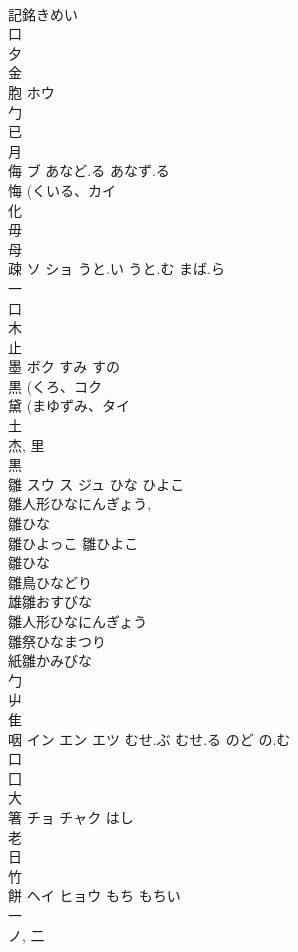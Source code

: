 \documentclass[8pt]{extreport}
\begin{document}
\begin{CJK}{UTF8}{min}
\\	記銘きめい
\\	口 
\\	夕 
\\	金 
\\	胞	ホウ		
\\	勹 
\\	已 
\\	月 
\\	侮	ブ	あなど.る あなず.る	
\\	悔 (くいる、カイ 
\\	化 
\\	毋 
\\	母 
\\	疎	ソ ショ	うと.い うと.む まば.ら	
\\	一 
\\	口 
\\	木 
\\	止 
\\	墨	ボク	すみ すの	
\\	黒 (くろ、コク 
\\	黛 (まゆずみ、タイ 
\\	土 
\\	杰, 里 
\\	黒 
\\	雛	スウ ス ジュ	ひな ひよこ	
\\	雛人形ひなにんぎょう, 
\\	雛ひな 
\\	雛ひよっこ 雛ひよこ 
\\	雛ひな 
\\	雛鳥ひなどり 
\\	雄雛おすびな 
\\	雛人形ひなにんぎょう 
\\	雛祭ひなまつり 
\\	紙雛かみびな 
\\	勹 
\\	屮 
\\	隹 
\\	咽	イン エン エツ	むせ.ぶ むせ.る のど の.む	
\\	口 
\\	囗 
\\	大 
\\	箸	チョ チャク	はし	
\\	老 
\\	日 
\\	竹 
\\	餅	ヘイ ヒョウ	もち もちい	
\\	一 
\\	ノ, 二 

\end{CJK}
\end{document}
